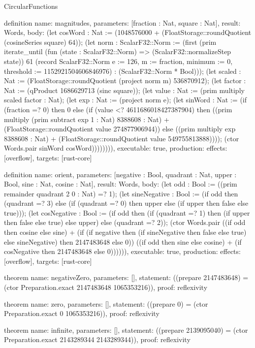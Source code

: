 \begin{lexlean}{CircularFunctions}
\begin{semanticmodule}
definition{
  name: magnitudes,
  parameters: [fraction : Nat, square : Nat],
  result: Words,
  body: (let cosWord : Nat := (1048576000 + (FloatStorage::roundQuotient (cosineSeries square) 64)); (let norm : ScalarF32::Norm := (first (prim iterate_until (fun (state : ScalarF32::Norm) => (ScalarF32::normalizeStep state)) 61 (record ScalarF32::Norm {e := 126, m := fraction, minimum := 0, threshold := 1152921504606846976}) : (ScalarF32::Norm * Bool))); (let scaled : Nat := (FloatStorage::roundQuotient (project norm m) 536870912); (let factor : Nat := (qProduct 1686629713 (sinc square)); (let value : Nat := (prim multiply scaled factor : Nat); (let exp : Nat := (project norm e); (let sinWord : Nat := (if (fraction =? 0) then 0 else (if (value <? 4611686018427387904) then ((prim multiply (prim subtract exp 1 : Nat) 8388608 : Nat) + (FloatStorage::roundQuotient value 274877906944)) else ((prim multiply exp 8388608 : Nat) + (FloatStorage::roundQuotient value 549755813888)))); (ctor Words.pair sinWord cosWord)))))))),
  executable: true,
  production: {effects: [overflow], targets: [rust-core]}
}

definition{
  name: orient,
  parameters: [negative : Bool, quadrant : Nat, upper : Bool, sine : Nat, cosine : Nat],
  result: Words,
  body: (let odd : Bool := ((prim remainder quadrant 2 0 : Nat) =? 1); (let sineNegative : Bool := (if odd then (quadrant =? 3) else (if (quadrant =? 0) then upper else (if upper then false else true))); (let cosNegative : Bool := (if odd then (if (quadrant =? 1) then (if upper then false else true) else upper) else (quadrant =? 2)); (ctor Words.pair ((if odd then cosine else sine) + (if (if negative then (if sineNegative then false else true) else sineNegative) then 2147483648 else 0)) ((if odd then sine else cosine) + (if cosNegative then 2147483648 else 0)))))),
  executable: true,
  production: {effects: [overflow], targets: [rust-core]}
}

theorem{
  name: negativeZero,
  parameters: [],
  statement: ((prepare 2147483648) = (ctor Preparation.exact 2147483648 1065353216)),
  proof: reflexivity{}
}

theorem{
  name: zero,
  parameters: [],
  statement: ((prepare 0) = (ctor Preparation.exact 0 1065353216)),
  proof: reflexivity{}
}

theorem{
  name: infinite,
  parameters: [],
  statement: ((prepare 2139095040) = (ctor Preparation.exact 2143289344 2143289344)),
  proof: reflexivity{}
}
\end{semanticmodule}
\end{lexlean}
